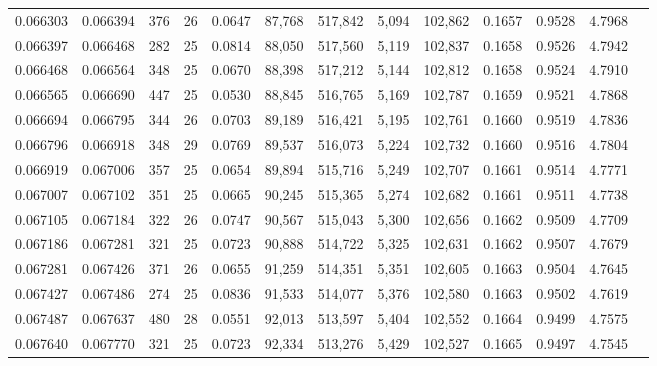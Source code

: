 \begin{tabular}{rrrrrrrrrrrrr}
0.066303 & 0.066394 & 376 &  26 &                                     0.0647 &  87,768 & 517,842 &   5,094 & 102,862 & 0.1657 & 0.9528 & 4.7968 \\
0.066397 & 0.066468 & 282 &  25 &                                     0.0814 &  88,050 & 517,560 &   5,119 & 102,837 & 0.1658 & 0.9526 & 4.7942 \\
0.066468 & 0.066564 & 348 &  25 &                                     0.0670 &  88,398 & 517,212 &   5,144 & 102,812 & 0.1658 & 0.9524 & 4.7910 \\
0.066565 & 0.066690 & 447 &  25 &                                     0.0530 &  88,845 & 516,765 &   5,169 & 102,787 & 0.1659 & 0.9521 & 4.7868 \\
0.066694 & 0.066795 & 344 &  26 &                                     0.0703 &  89,189 & 516,421 &   5,195 & 102,761 & 0.1660 & 0.9519 & 4.7836 \\
0.066796 & 0.066918 & 348 &  29 &                                     0.0769 &  89,537 & 516,073 &   5,224 & 102,732 & 0.1660 & 0.9516 & 4.7804 \\
0.066919 & 0.067006 & 357 &  25 &                                     0.0654 &  89,894 & 515,716 &   5,249 & 102,707 & 0.1661 & 0.9514 & 4.7771 \\
0.067007 & 0.067102 & 351 &  25 &                                     0.0665 &  90,245 & 515,365 &   5,274 & 102,682 & 0.1661 & 0.9511 & 4.7738 \\
0.067105 & 0.067184 & 322 &  26 &                                     0.0747 &  90,567 & 515,043 &   5,300 & 102,656 & 0.1662 & 0.9509 & 4.7709 \\
0.067186 & 0.067281 & 321 &  25 &                                     0.0723 &  90,888 & 514,722 &   5,325 & 102,631 & 0.1662 & 0.9507 & 4.7679 \\
0.067281 & 0.067426 & 371 &  26 &                                     0.0655 &  91,259 & 514,351 &   5,351 & 102,605 & 0.1663 & 0.9504 & 4.7645 \\
0.067427 & 0.067486 & 274 &  25 &                                     0.0836 &  91,533 & 514,077 &   5,376 & 102,580 & 0.1663 & 0.9502 & 4.7619 \\
0.067487 & 0.067637 & 480 &  28 &                                     0.0551 &  92,013 & 513,597 &   5,404 & 102,552 & 0.1664 & 0.9499 & 4.7575 \\
0.067640 & 0.067770 & 321 &  25 &                                     0.0723 &  92,334 & 513,276 &   5,429 & 102,527 & 0.1665 & 0.9497 & 4.7545 \\

\end{tabular}
